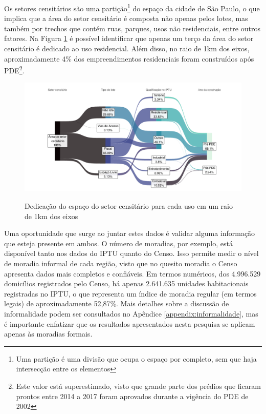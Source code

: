 Os setores censitários são uma partição\footnote{Uma partição é uma divisão que ocupa o espaço por completo, sem que haja intersecção entre os elementos} do espaço da cidade de São Paulo, o que implica que a área do setor censitário é composta não apenas pelos lotes, mas também por trechos que contém ruas, parques, usos não residenciais, entre outros fatores. Na Figura \ref{fig:area-setor} é possível identificar que apenas um terço da área do setor censitário é dedicado ao uso residencial. Além disso, no raio de 1km dos eixos, aproximadamente 4\% dos empreendimentos residenciais foram construídos após PDE\footnote{Este valor está superestimado, visto que grande parte dos prédios que ficaram prontos entre 2014 a 2017 foram aprovados durante a vigência do PDE de 2002}.
 
\begin{figure}[h]
    \centering
    \caption{Dedicação do espaço do setor censitário para cada uso em um raio de 1km dos eixos}
    \includegraphics[width = \linewidth]{figuras/area_setor.pdf}
    \label{fig:area-setor}
\end{figure}

Uma oportunidade que surge ao juntar estes dados é validar alguma informação que esteja presente em ambos. O número de moradias, por exemplo, está disponível tanto nos dados do IPTU quanto do Censo. Isso permite medir o nível de moradia informal de cada região, visto que no quesito moradia o Censo apresenta dados mais completos e confiáveis. Em termos numéricos, dos 4.996.529 domicílios registrados pelo Censo, há apenas 2.641.635 unidades habitacionais registradas no IPTU, o que representa um índice de moradia regular (em termos legais) de aproximadamente 52,87\%. Mais detalhes sobre a discussão de informalidade podem ser consultados no Apêndice \ref{appendix:informalidade}, mas é importante enfatizar que os resultados apresentados nesta pesquisa se aplicam apenas às moradias formais.



